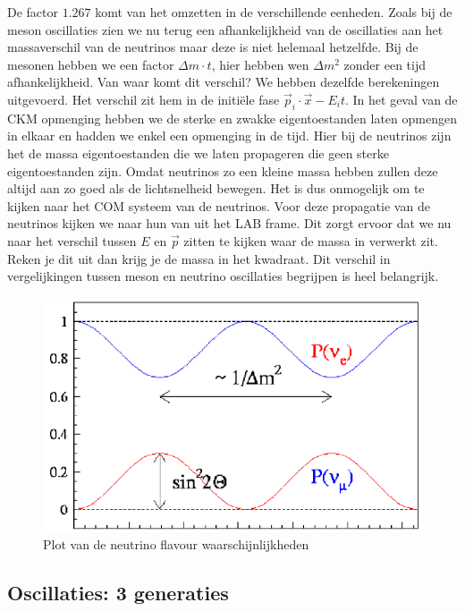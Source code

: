 \documentclass[../main.tex]{subfiles}
\begin{document}
De factor $1.267$ komt van het omzetten in de verschillende eenheden. Zoals bij de meson oscillaties zien we nu terug een afhankelijkheid van de oscillaties aan het massaverschil van de neutrinos maar deze is niet helemaal hetzelfde. Bij de mesonen hebben we een factor $\Delta m\cdot t$, hier hebben wen $\Delta m^2$ zonder een tijd afhankelijkheid. Van waar komt dit verschil? We hebben dezelfde berekeningen uitgevoerd. Het verschil zit hem in de initiële fase $\vec{p}_{i} \cdot \vec{x}-E_{i} t$. In het geval van de CKM opmenging hebben we de sterke en zwakke eigentoestanden laten opmengen in elkaar en hadden we enkel een opmenging in de tijd. Hier bij de neutrinos zijn het de massa eigentoestanden die we laten propageren die geen sterke eigentoestanden zijn. Omdat neutrinos zo een kleine massa hebben zullen deze altijd aan zo goed als de lichtsnelheid bewegen. Het is dus onmogelijk om te kijken naar het COM systeem van de neutrinos. Voor deze propagatie van de neutrinos kijken we naar hun van uit het LAB frame. Dit zorgt ervoor dat we nu naar het verschil tussen $E$ en $\vec{p}$ zitten te kijken waar de massa in verwerkt zit. Reken je dit uit dan krijg je de massa in het kwadraat. {\color{red} Dit verschil in vergelijkingen tussen meson en neutrino oscillaties begrijpen is heel belangrijk.}

\begin{figure}[h]
    \centering
    \includegraphics[width=0.6\linewidth]{neutrinos/neutrino_osc.png}
    \caption{Plot van de neutrino flavour waarschijnlijkheden}%
    \label{fig:neutrinos/neutrino_osc}
\end{figure}

\subsection{Oscillaties: 3 generaties}%
\label{sub:oscillaties_3_generaties}
\end{document}
